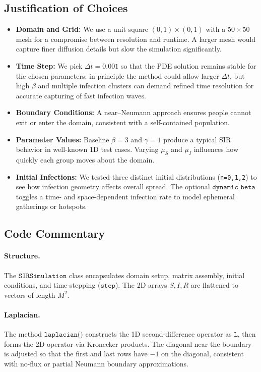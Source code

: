 \subsection{Justification of Choices}

\begin{itemize}
  \item \textbf{Domain and Grid:} We use a unit square \((0,1)\times (0,1)\) with a \(50\times 50\) mesh for a compromise between resolution and runtime. A larger mesh would capture finer diffusion details but slow the simulation significantly.
  \item \textbf{Time Step:} We pick \(\Delta t = 0.001\) so that the PDE solution remains stable for the chosen parameters; in principle the method could allow larger \(\Delta t\), but high \(\beta\) and multiple infection clusters can demand refined time resolution for accurate capturing of fast infection waves.
  \item \textbf{Boundary Conditions:} A near--Neumann approach ensures people cannot exit or enter the domain, consistent with a self-contained population. 
  \item \textbf{Parameter Values:} Baseline \(\beta=3\) and \(\gamma=1\) produce a typical SIR behavior in well-known 1D test cases. Varying \(\mu_S\) and \(\mu_I\) influences how quickly each group moves about the domain.
  \item \textbf{Initial Infections:} We tested three distinct initial distributions (\texttt{n=0,1,2}) to see how infection geometry affects overall spread. The optional \(\texttt{dynamic\_beta}\) toggles a time- and space-dependent infection rate to model ephemeral gatherings or hotspots.
\end{itemize}

\subsection{Code Commentary}

\paragraph{Structure.}
The \(\texttt{SIRSimulation}\) class encapsulates domain setup, matrix assembly, initial conditions, and time-stepping (\(\texttt{step}\)). The 2D arrays \(S,I,R\) are flattened to vectors of length \(M^2\). 

\paragraph{Laplacian.}
The method \(\texttt{laplacian()}\) constructs the 1D second-difference operator as \(\texttt{L}\), then forms the 2D operator via Kronecker products. The diagonal near the boundary is adjusted so that the first and last rows have \(-1\) on the diagonal, consistent with no-flux or partial Neumann boundary approximations.

